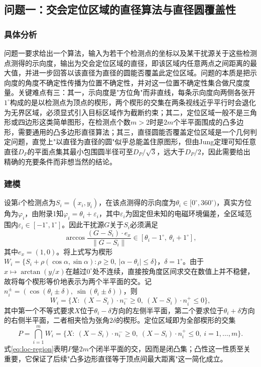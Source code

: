 \documentclass[12pt,a4paper]{ctexart}
\begin{document}
\subsection{问题一：交会定位区域的直径算法与直径圆覆盖性}

\subsubsection{具体分析}

问题一要求给出一个算法，输入为若干个检测点的坐标以及某干扰源关于这些检测点测得的示向度，输出为交会定位区域的直径，即该区域内任意两点之间距离的最大值，并进一步回答以该直径为直径的圆能否覆盖此定位区域。问题的本质是把示向度的角度不确定性传播为位置不确定性，并对这一位置不确定性集合做尺度度量。关键难点有三：其一，示向度是"方位角"而非直线，每条示向度向两侧各张开$1^\circ$构成的是以检测点为顶点的楔形，两个楔形的交集在两条视线近乎平行时会退化为无界区域，必须显式引入目标区域作为截断约束；其二，定位区域一般不是三角形或四边形这类简单图形，在检测点个数$m>2$时是$2m$个半平面围成的凸多边形，需要通用的凸多边形直径算法；其三，直径圆能否覆盖定位区域是一个几何判定问题，直觉上"以直径为直径的圆"似乎总能盖住原图形，但由Jung定理可知任意直径$D_P$的平面点集其最小包围圆半径可至$D_P/\sqrt3$，远大于$D_P/2$，因此需要给出精确的充要条件而非想当然的结论。

\subsubsection{建模}

设第$i$个检测点为$S_i=(x_i,y_i)$，在该点测得的示向度为$\theta_i\in[0^\circ,360^\circ)$，真实方位角为$\varphi_i$，由附录1知$\varphi_i=\theta_i+\varepsilon_i$，其中$\varepsilon_i$为固定但未知的电磁环境偏差，全区域范围内$\varepsilon_i\in[-1^\circ,1^\circ]$。因此干扰源$G$关于$S_i$必须满足
\begin{equation}
\arccos\frac{(G-S_i)\cdot e_x}{\lVert G-S_i\rVert}\in[\theta_i-1^\circ,\ \theta_i+1^\circ],
\end{equation}
其中$e_x=(1,0)$。将上式写为楔形$W_i=\{S_i+\rho(\cos\alpha,\sin\alpha):\rho\ge0,\ \lvert\alpha-\theta_i\rvert\le\delta\}$，$\delta=1^\circ$。由于$x\mapsto\arctan(y/x)$在越过$0^\circ$处不连续，直接按角度区间求交在数值上并不稳健，故将每个楔形等价地表示为两个半平面的交。记$n_i^\pm=(\cos(\theta_i\pm\delta),\ \sin(\theta_i\pm\delta))$，则
\begin{equation}
W_i=\bigl\{X:\ (X-S_i)\cdot n_i^-\ge 0,\ (X-S_i)\cdot n_i^+\le 0\bigr\},
\label{eq:wedge-halfplane}
\end{equation}
其中第一个不等式要求$X$位于$\theta_i-\delta$方向的左侧半平面，第二个要求位于$\theta_i+\delta$方向的右侧半平面，二者相夹恰为张角$2\delta$的楔形。定位区域即为全部楔形的交集
\begin{equation}
P=\bigcap_{i=1}^{m}W_i=\bigl\{X:\ (X-S_i)\cdot n_i^-\ge 0,\ (X-S_i)\cdot n_i^+\le 0,\ i=1,\dots,m\bigr\}.
\label{eq:loc-region}
\end{equation}
式\eqref{eq:loc-region}表明$P$是$2m$个闭半平面的交，因而是闭凸集；凸性这一性质至关重要，它保证了后续"凸多边形直径等于顶点间最大距离"这一简化成立。
\end{document}
